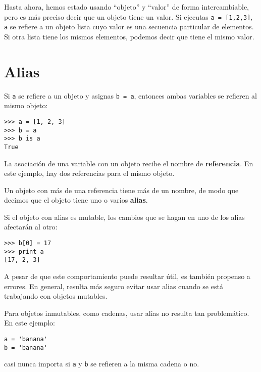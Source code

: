 
Hasta ahora, hemos estado usando ``objeto'' y ``valor''
de forma intercambiable, pero es más preciso decir que un objeto tiene
un valor. Si ejecutas {\tt a = [1,2,3]}, {\tt a} se refiere a un objeto
lista cuyo valor es una secuencia particular de elementos. Si otra
lista tiene los mismos elementos, podemos decir que tiene el mismo valor.



\section{Alias}


Si {\tt a} se refiere a un objeto y asignas {\tt b = a},
entonces ambas variables se refieren al mismo objeto:

\beforeverb
\begin{verbatim}
>>> a = [1, 2, 3]
>>> b = a
>>> b is a
True
\end{verbatim}
\afterverb
%

La asociación de una variable con un objeto recibe el nombre de
{\bf referencia}. En este ejemplo, hay dos referencias para el mismo
objeto.


Un objeto con más de una referencia tiene más
de un nombre, de modo que decimos que el objeto tiene uno o varios {\bf alias}.


Si el objeto con alias es mutable,
los cambios que se hagan en uno de los alias
afectarán al otro:

\beforeverb
\begin{verbatim}
>>> b[0] = 17
>>> print a
[17, 2, 3]
\end{verbatim}
\afterverb
%
A pesar de que este comportamiento puede resultar útil, es también propenso a errores. En general,
resulta más seguro evitar usar alias cuando se está trabajando con objetos
mutables.


Para objetos inmutables, como cadenas, usar alias no resulta tan
problemático. En este ejemplo:

\beforeverb
\begin{verbatim}
a = 'banana'
b = 'banana'
\end{verbatim}
\afterverb
%
casi nunca importa si {\tt a} y {\tt b} se refieren
a la misma cadena o no.


